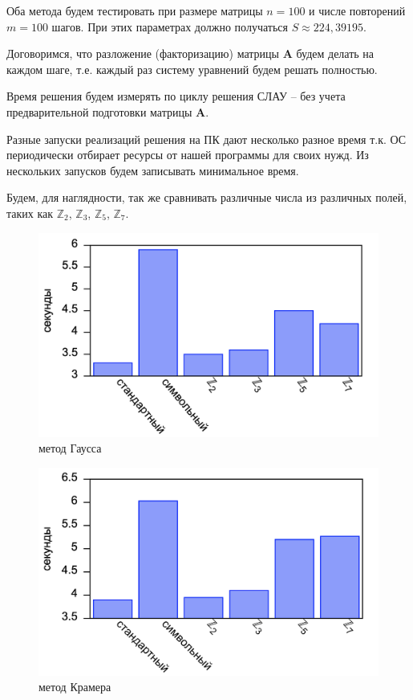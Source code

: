 \documentclass[master, och, diploma, times]{sty/SCWorks}
\theoremstyle{plain}
\theoremstyle{definition}
\begin{document}
Оба метода будем тестировать при размере матрицы $n=100$ и числе повторений $m=100$ шагов. При этих параметрах должно получаться $S\approx 224,39195$.

Договоримся, что разложение (факторизацию) матрицы $\boldsymbol{A}$ будем делать на каждом шаге, т.е. каждый раз систему уравнений будем решать полностью.

Время решения будем измерять по циклу решения СЛАУ – без учета предварительной подготовки матрицы $\boldsymbol{A}$.

Разные запуски реализаций решения на ПК дают несколько разное время т.к. ОС периодически отбирает ресурсы от нашей программы для своих нужд. Из нескольких запусков будем записывать минимальное время.

Будем, для наглядности, так же сравнивать различные числа из различных полей, таких как $\mathbb{Z}_2$, $\mathbb{Z}_3$, $\mathbb{Z}_5$, $\mathbb{Z}_7$.
 
\begin{figure}[H]
\centerline{\includegraphics[width=0.85\linewidth]{../gnuplot/single/system_gauss/plot.png}}
\caption{метод Гаусса}
\label{img:single:system}
\end{figure}

\begin{figure}[H]
\centerline{\includegraphics[width=0.85\linewidth]{../gnuplot/single/system_cramer/plot.png}}
\caption{метод Крамера}
\label{img:single:system}
\end{figure}
 
\end{document}
